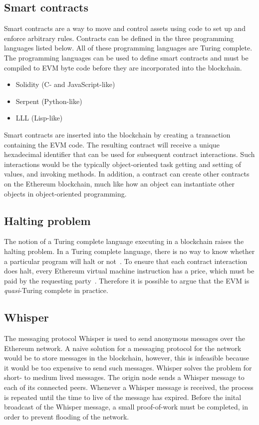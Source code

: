 \subsection{Smart contracts}
\label{sec:tech:contracts}
Smart contracts are a way to move and control assets using code to set up and enforce arbitrary rules. Contracts can be defined in the three programming languages listed below. All of these programming languages are Turing complete. The programming languages can be used to define smart contracts and must be compiled to EVM byte code before they are incorporated into the blockchain.

\begin{itemize}
    \item Solidity (C- and JavaScript-like)
    \item Serpent (Python-like)
    \item LLL (Lisp-like)
\end{itemize}

Smart contracts are inserted into the blockchain by creating a transaction containing the EVM code. The resulting contract will receive a unique hexadecimal identifier that can be used for subsequent contract interactions. Such interactions would be the typically object-oriented task getting and setting of values, and invoking methods. In addition, a contract can create other contracts on the Ethereum blockchain, much like how an object can instantiate other objects in object-oriented programming.

\subsection{Halting problem}
The notion of a Turing complete language executing in a blockchain raises the halting problem. In a Turing complete language, there is no way to know whether a particular program will halt or not~\cite{hopcroft}. To ensure that each contract interaction does halt, every Ethereum virtual machine instruction has a price, which must be paid by the requesting party~\cite{ethereum:yellow}. Therefore it is possible to argue that the EVM is \emph{quasi}-Turing complete in practice.

\subsection{Whisper}
The messaging protocol Whisper is used to send anonymous messages over the Ethereum network. A naive solution for a messaging protocol for the network would be to store messages in the blockchain, however, this is infeasible because it would be too expensive to send such messages. Whisper solves the problem for short- to medium lived messages. The origin node sends a Whisper message to each of its connected peers. Whenever a Whisper message is received, the process is repeated until the time to live of the message has expired. Before the inital broadcast of the Whisper message, a small proof-of-work must be completed, in order to prevent flooding of the network.

